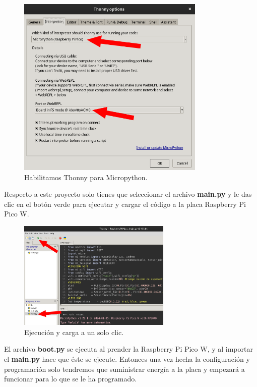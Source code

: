 \begin{figure}[h]
	\centering
	\includegraphics[width=0.8\textwidth]{img/desarrollo/thonny_seleccionInterpreter.png}
	\caption{Habilitamos Thonny para Micropython.}
\end{figure}

Respecto a este proyecto solo tienes que seleccionar el archivo \textbf{main.py} y le das clic en el botón verde para ejecutar y cargar el código a la placa Raspberry Pi Pico W. 

\begin{figure}[h]
	\centering
	\includegraphics[width=0.65\textwidth]{img/desarrollo/thonny_ejecucion.png}
	\caption{Ejecución y carga a un solo clic.}
\end{figure}

El archivo \textbf{boot.py} se ejecuta al prender la Raspberry Pi Pico W, y al importar el \textbf{main.py} hace que éste se ejecute. Entonces una vez hecha la configuración y programación solo tendremos que suministrar energía a la placa y empezará a funcionar para lo que se le ha programado.


